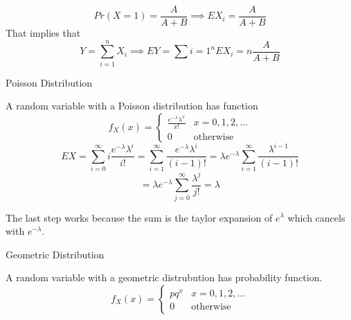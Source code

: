 \documentclass{report}
\begin{document}
\begin{description}
\begin{mdframed}
            \begin{displaymath}
                Pr(X = 1) = \frac{A}{A + B}
                \implies
                EX_i = \frac{A}{A + B}
            \end{displaymath}
            That implies that
            \begin{displaymath}
                Y = \sum_{i =1}^n X_i
                \implies
                EY = \sum{i=1}^n EX_i = n\frac{A}{A+B}
            \end{displaymath}
        \end{mdframed}
    \item {\large Poisson Distribution}
        \begin{mdframed}
            A random variable with a Poisson distribution
            has function
            \begin{displaymath}
                f_X(x) = 
                \begin{cases}
                    \frac{e^{-\lambda} \lambda^{x}}{x!} & x = 0, 1, 2, ...\\ 
                    0 & \textrm{otherwise}
                \end{cases}
            \end{displaymath}
            \begin{displaymath}
                EX = 
                \sum_{i = 0}^{\infty} i \frac{e^{-\lambda} \lambda^{i}}{i!}
                =
                \sum_{i = 1}^{\infty} \frac{e^{-\lambda} \lambda^{i}}{(i - 1)!}
                =
                \lambda e^{-\lambda} \sum_{i=1}^{\infty} \frac{\lambda^{i -1}}{(i-1)!}
            \end{displaymath}
            \begin{displaymath}
                = \lambda e^{-\lambda} \sum_{j = 0}^{\infty}
                \frac{\lambda^{j}}{j!} 
                = \lambda
            \end{displaymath}
            
            The last step works because the sum is the taylor
            expansion of $e^{\lambda}$ which cancels with
            $e^{-\lambda}$.
        \end{mdframed}
        \pagebreak
    \item {\large Geometric Distribution}
        \begin{mdframed}
            A random variable with a geometric distrubution has
            probability function.
            \begin{displaymath}
                f_X(x) =
                \begin{cases}
                    pq^x & x = 0, 1, 2, ...\\
                    0 & \textrm{otherwise}
                \end{cases}
            \end{displaymath}


\end{mdframed}
\end{description}
\end{document}
